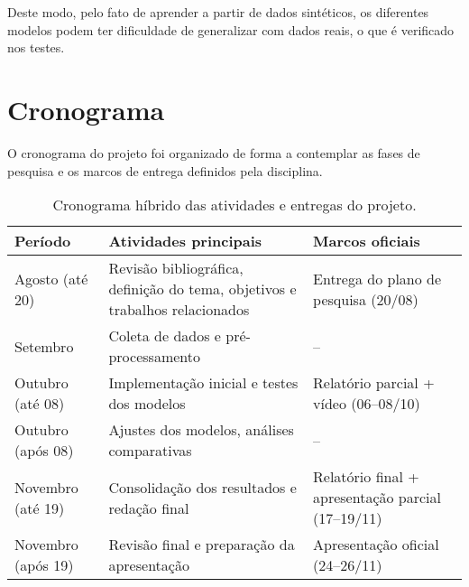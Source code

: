 \documentclass[english, spanish, brazilian]{RBIEarticle} %
\begin{document}
Deste modo, pelo fato de aprender a partir de dados sintéticos, os diferentes modelos podem ter dificuldade de generalizar com dados reais, o que é verificado nos testes.


\pagebreak
\section{Cronograma}
O cronograma do projeto foi organizado de forma a contemplar as fases de pesquisa e os marcos de entrega definidos pela disciplina.
\begin{table}[h]
\centering
\begin{tabular}{p{3cm} p{7cm} p{5cm}}
\hline
\textbf{Período} & \textbf{Atividades principais} & \textbf{Marcos oficiais} \\
\hline
Agosto (até 20) & Revisão bibliográfica, definição do tema, objetivos e trabalhos relacionados & Entrega do plano de pesquisa (20/08) \\
Setembro        & Coleta de dados e pré-processamento & -- \\
Outubro (até 08) & Implementação inicial e testes dos modelos & Relatório parcial + vídeo (06--08/10) \\
Outubro (após 08) & Ajustes dos modelos, análises comparativas & -- \\
Novembro (até 19) & Consolidação dos resultados e redação final & Relatório final + apresentação parcial (17--19/11) \\
Novembro (após 19) & Revisão final e preparação da apresentação & Apresentação oficial (24--26/11) \\
\hline
\end{tabular}
\caption{Cronograma híbrido das atividades e entregas do projeto.}
\label{tab:cronograma}
\end{table}





\pagebreak
\nocite{*}
\printbibliography
\end{document}
